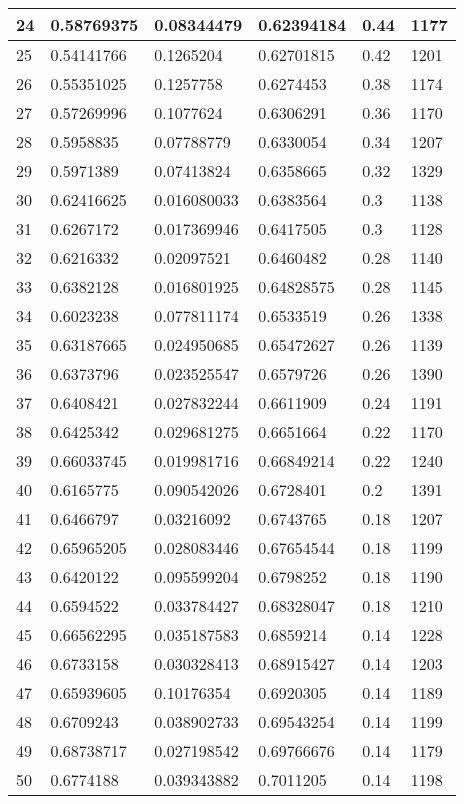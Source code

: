 \begin{longtable}{|l|l|l|l|l|l|}
24 & 0.58769375 & 0.08344479 & 0.62394184 & 0.44 & 1177 \\ \hline 
25 & 0.54141766 & 0.1265204 & 0.62701815 & 0.42 & 1201 \\ \hline 
26 & 0.55351025 & 0.1257758 & 0.6274453 & 0.38 & 1174 \\ \hline 
27 & 0.57269996 & 0.1077624 & 0.6306291 & 0.36 & 1170 \\ \hline 
28 & 0.5958835 & 0.07788779 & 0.6330054 & 0.34 & 1207 \\ \hline 
29 & 0.5971389 & 0.07413824 & 0.6358665 & 0.32 & 1329 \\ \hline 
30 & 0.62416625 & 0.016080033 & 0.6383564 & 0.3 & 1138 \\ \hline 
31 & 0.6267172 & 0.017369946 & 0.6417505 & 0.3 & 1128 \\ \hline 
32 & 0.6216332 & 0.02097521 & 0.6460482 & 0.28 & 1140 \\ \hline 
33 & 0.6382128 & 0.016801925 & 0.64828575 & 0.28 & 1145 \\ \hline 
34 & 0.6023238 & 0.077811174 & 0.6533519 & 0.26 & 1338 \\ \hline 
35 & 0.63187665 & 0.024950685 & 0.65472627 & 0.26 & 1139 \\ \hline 
36 & 0.6373796 & 0.023525547 & 0.6579726 & 0.26 & 1390 \\ \hline 
37 & 0.6408421 & 0.027832244 & 0.6611909 & 0.24 & 1191 \\ \hline 
38 & 0.6425342 & 0.029681275 & 0.6651664 & 0.22 & 1170 \\ \hline 
39 & 0.66033745 & 0.019981716 & 0.66849214 & 0.22 & 1240 \\ \hline 
40 & 0.6165775 & 0.090542026 & 0.6728401 & 0.2 & 1391 \\ \hline 
41 & 0.6466797 & 0.03216092 & 0.6743765 & 0.18 & 1207 \\ \hline 
42 & 0.65965205 & 0.028083446 & 0.67654544 & 0.18 & 1199 \\ \hline 
43 & 0.6420122 & 0.095599204 & 0.6798252 & 0.18 & 1190 \\ \hline 
44 & 0.6594522 & 0.033784427 & 0.68328047 & 0.18 & 1210 \\ \hline 
45 & 0.66562295 & 0.035187583 & 0.6859214 & 0.14 & 1228 \\ \hline 
46 & 0.6733158 & 0.030328413 & 0.68915427 & 0.14 & 1203 \\ \hline 
47 & 0.65939605 & 0.10176354 & 0.6920305 & 0.14 & 1189 \\ \hline 
48 & 0.6709243 & 0.038902733 & 0.69543254 & 0.14 & 1199 \\ \hline 
49 & 0.68738717 & 0.027198542 & 0.69766676 & 0.14 & 1179 \\ \hline 
50 & 0.6774188 & 0.039343882 & 0.7011205 & 0.14 & 1198 \\ \hline 
\end{longtable}